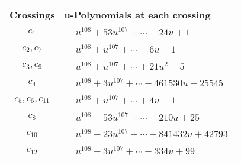 \documentclass[1p]{elsarticle_modified}
\theoremstyle{definition}
\begin{document}
\begin{tabular}{m{50pt}|m{274pt}}
Crossings & \hspace{64pt}u-Polynomials at each crossing \\
\hline $$\begin{aligned}c_{1}\end{aligned}$$&$\begin{aligned}
&u^{108}+53 u^{107}+\cdots+24 u+1
\end{aligned}$\\
\hline $$\begin{aligned}c_{2},c_{7}\end{aligned}$$&$\begin{aligned}
&u^{108}+u^{107}+\cdots-6 u-1
\end{aligned}$\\
\hline $$\begin{aligned}c_{3},c_{9}\end{aligned}$$&$\begin{aligned}
&u^{108}+u^{107}+\cdots+21 u^2-5
\end{aligned}$\\
\hline $$\begin{aligned}c_{4}\end{aligned}$$&$\begin{aligned}
&u^{108}+3 u^{107}+\cdots-461530 u-25545
\end{aligned}$\\
\hline $$\begin{aligned}c_{5},c_{6},c_{11}\end{aligned}$$&$\begin{aligned}
&u^{108}+u^{107}+\cdots+4 u-1
\end{aligned}$\\
\hline $$\begin{aligned}c_{8}\end{aligned}$$&$\begin{aligned}
&u^{108}-53 u^{107}+\cdots-210 u+25
\end{aligned}$\\
\hline $$\begin{aligned}c_{10}\end{aligned}$$&$\begin{aligned}
&u^{108}-23 u^{107}+\cdots-841432 u+42793
\end{aligned}$\\
\hline $$\begin{aligned}c_{12}\end{aligned}$$&$\begin{aligned}
&u^{108}-3 u^{107}+\cdots-334 u+99
\end{aligned}$\\
\hline
\end{tabular}\\~\\
\end{document}
